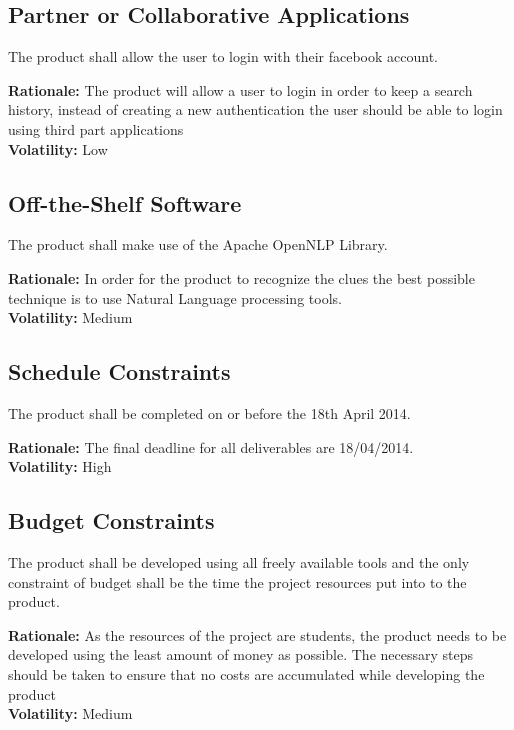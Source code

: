 \subsection{Partner or Collaborative Applications}

\noindent\llap{\textbf{[R4/1]}}The product shall allow the user to login with their facebook account.

\textbf{Rationale:}  The product will allow a user to login in order to keep a search history, instead of creating a new authentication the user should be able to login using third part applications\\
\textbf{Volatility:} Low

\subsection{Off-the-Shelf Software}

\noindent\llap{\textbf{[R5/1]}}The product shall make use of the Apache OpenNLP Library.

\textbf{Rationale:}  In order for the product to recognize the clues the best possible technique is to use Natural Language processing tools.\\
\textbf{Volatility:} Medium

\subsection{Schedule Constraints}

\noindent\llap{\textbf{[R6/1]}}The product shall be completed on or before the 18th April 2014.

\textbf{Rationale:}  The final deadline for all deliverables are 18/04/2014. \\
\textbf{Volatility:} High

\subsection{Budget Constraints}

\noindent\llap{\textbf{[R7/1]}}The product shall be developed using all freely available tools and the only constraint of budget shall be the time the project resources put into to the product.

\textbf{Rationale:}  As the resources of the project are students, the product needs to be developed using the least amount of money as possible. The necessary steps should be taken to ensure that no costs are accumulated while developing the product \\
\textbf{Volatility:} Medium

